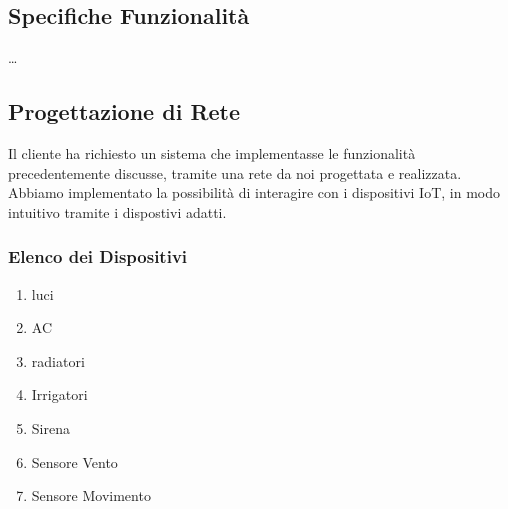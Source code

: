 \documentclass[italian, 12pt, a4paper]{article}
\begin{document}
\subsection{Specifiche Funzionalità}
\ldots
\subsection{Progettazione di Rete}
Il cliente ha richiesto un sistema che implementasse le funzionalità precedentemente discusse, tramite una rete da noi progettata e realizzata. Abbiamo implementato la possibilità di interagire con i dispositivi IoT, in modo intuitivo tramite i dispostivi adatti. 
\subsubsection{Elenco dei Dispositivi}
\begin{enumerate}
    \item luci
    \item AC
    \item radiatori
    \item Irrigatori
    \item Sirena
    \item Sensore Vento
    \item Sensore Movimento
\end{enumerate}
\clearpage
\end{document}
